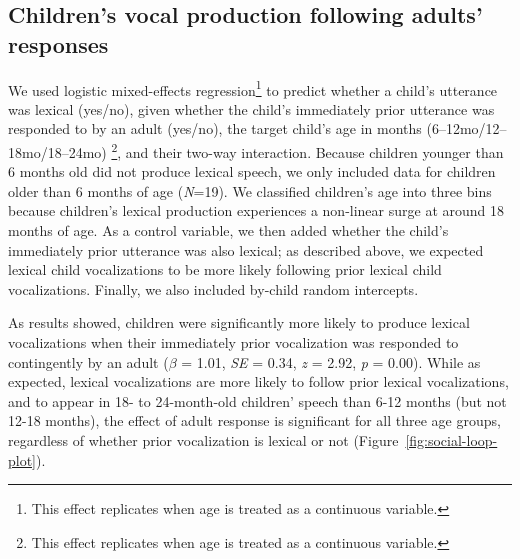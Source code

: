 \documentclass[
  man]{apa6}
\begin{document}
\hypertarget{childrens-vocal-production-following-adults-responses}{%
\subsection{Children's vocal production following adults' responses}\label{childrens-vocal-production-following-adults-responses}}

We used logistic mixed-effects regression\footnote{This effect replicates when age is treated as a continuous variable.} to predict whether a child's utterance was lexical (yes/no), given whether the child's immediately prior utterance was responded to by an adult (yes/no), the target child's age in months (6--12mo/12--18mo/18--24mo) \footnote{This effect replicates when age is treated as a continuous variable.}, and their two-way interaction. Because children younger than 6 months old did not produce lexical speech, we only included data for children older than 6 months of age (\emph{N}=19). We classified children's age into three bins because children's lexical production experiences a non-linear surge at around 18 months of age. As a control variable, we then added whether the child's immediately prior utterance was also lexical; as described above, we expected lexical child vocalizations to be more likely following prior lexical child vocalizations. Finally, we also included by-child random intercepts.

As results showed, children were significantly more likely to produce lexical vocalizations when their immediately prior vocalization was responded to contingently by an adult (\(\beta\) = 1.01, \emph{SE} = 0.34, \emph{z} = 2.92, \emph{p} = 0.00). While as expected, lexical vocalizations are more likely to follow prior lexical vocalizations, and to appear in 18- to 24-month-old children' speech than 6-12 months (but not 12-18 months), the effect of adult response is significant for all three age groups, regardless of whether prior vocalization is lexical or not (Figure~\ref{fig:social-loop-plot}).
\end{document}
